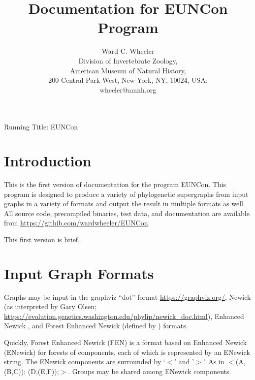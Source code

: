\documentclass[11pt]{memoir}
\begin{document}
	
	\title{Documentation for EUNCon Program}
	\author{Ward C. Wheeler\\
		Division of Invertebrate Zoology,\\ American Museum of Natural History,\\ 200 Central Park West, New York, NY, 10024, USA;\\wheeler@amnh.org}
	
	
	\maketitle
	\begin{center}
		Running Title: EUNCon
	\end{center}
	\newpage
	
	
	\section{Introduction}
	This is the first version of documentation for the program EUNCon.  This program is designed to produce a variety of 
	phylogenetic supergraphs from input graphs in a variety of formats and output the result in multiple formats as well.
	All source code, precompiled binaries, test data, and documentation are available from \url{https://githib.com/wardwheeler/EUNCon}.
	
	This first version is brief.
	
	\section{Input Graph Formats}
	Graphs may be input in the graphviz ``dot'' format \url{https://graphviz.org/}, Newick (as interpreted by Gary Olsen; \url{https://evolution.genetics.washington.edu/phylip/newick_doc.html}), Enhanced Newick \cite{Cardonaetal2008},
	and Forest Enhanced Newick (defined by \citealp{WheelerPhyloSuperGraphs}) formats.
	
	Quickly, Forest Enhanced Newick (FEN) is a format based on Enhanced Newick (ENewick) for forests of components, each
	of which is represented by an ENewick string.  The ENewick components are surrounded by `$<$' and '$>$'.
	As in $<$(A, (B,C)); (D,(E,F));$>$.  Groups may be shared among ENewick components.
	
\end{document}
